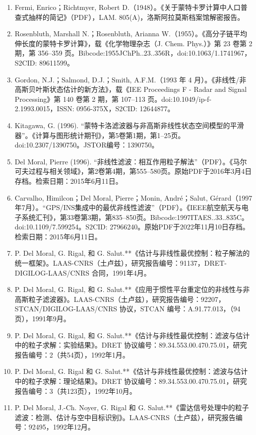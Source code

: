 \begin{enumerate}
\item Fermi, Enrico；Richtmyer, Robert D.（1948）。《关于蒙特卡罗计算中人口普查式抽样的简记》（PDF），LAM. 805(A)，洛斯阿拉莫斯档案馆解密报告。
\item Rosenbluth, Marshall N.；Rosenbluth, Arianna W.（1955）。《高分子链平均伸长度的蒙特卡罗计算》，载《化学物理杂志（J. Chem. Phys.）》第 23 卷第 2 期，第 356–359 页。Bibcode:1955JChPh..23..356R，doi:10.1063/1.1741967，S2CID: 89611599。
\item Gordon, N.J.；Salmond, D.J.；Smith, A.F.M.（1993 年 4 月）。《非线性/非高斯贝叶斯状态估计的新方法》，载《IEE Proceedings F - Radar and Signal Processing》第 140 卷第 2 期，第 107–113 页。doi:10.1049/ip-f-2.1993.0015，ISSN: 0956-375X，S2CID: 12644877。
\item Kitagawa, G. (1996). “蒙特卡洛滤波器与非高斯非线性状态空间模型的平滑器”。《计算与图形统计期刊》，第5卷第1期，第1–25页。doi:10.2307/1390750。JSTOR编号：1390750。
\item Del Moral, Pierre (1996). “非线性滤波：相互作用粒子解法”（PDF）。《马尔可夫过程与相关领域》，第2卷第4期，第555–580页。原始PDF于2016年3月4日存档。检索日期：2015年6月11日。
\item Carvalho, Himilcon；Del Moral, Pierre；Monin, André；Salut, Gérard（1997年7月）。“GPS/INS集成中的最优非线性滤波”（PDF）。《IEEE航空航天与电子系统汇刊》，第33卷第3期，第835–850页。Bibcode:1997ITAES..33..835C。doi:10.1109/7.599254。S2CID: 27966240。原始PDF于2022年11月10日存档。检索日期：2015年6月11日。
\item P. Del Moral, G. Rigal, 和 G. Salut.**《估计与非线性最优控制：粒子解法的统一框架》。LAAS-CNRS（土卢兹），研究报告编号：91137，DRET-DIGILOG-LAAS/CNRS 合同，1991年4月。
\item P. Del Moral, G. Rigal, 和 G. Salut.**《应用于惯性平台重定位的非线性与非高斯粒子滤波器》。LAAS-CNRS（土卢兹），研究报告编号：92207，STCAN/DIGILOG-LAAS/CNRS 协议，STCAN 编号：A.91.77.013，（94页），1991年9月。
\item P. Del Moral, G. Rigal, 和 G. Salut.**《估计与非线性最优控制：滤波与估计中的粒子求解：实验结果》。DRET 协议编号：89.34.553.00.470.75.01，研究报告编号：2（共54页），1992年1月。
\item P. Del Moral, G. Rigal 和 G. Salut.**《估计与非线性最优控制：滤波与估计中的粒子求解：理论结果》。DRET 协议编号：89.34.553.00.470.75.01，研究报告编号：3（共123页），1992年10月。
\item P. Del Moral, J.-Ch. Noyer, G. Rigal 和 G. Salut.**《雷达信号处理中的粒子滤波：检测、估计与空中目标识别》。LAAS-CNRS（土卢兹），研究报告编号：92495，1992年12月。

\end{enumerate}
